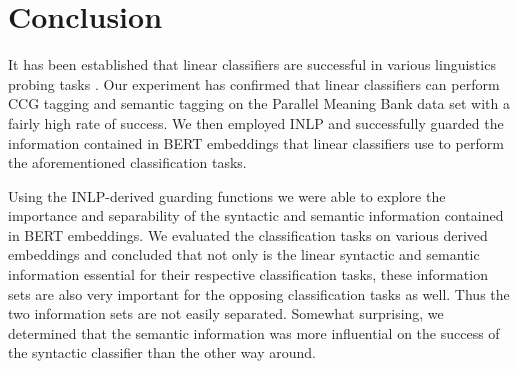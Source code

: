 \documentclass[11pt,a4paper]{article}
\begin{document}
        



\section{Conclusion}
\label{sec:conclusion}
It has been established that linear classifiers are successful in various linguistics probing tasks \citep{language-transfer}. Our experiment has confirmed that linear classifiers can perform CCG tagging and semantic tagging on the Parallel Meaning Bank data set \citep{pmbData} with a fairly high rate of success. We then employed INLP and successfully guarded the information contained in BERT embeddings that linear classifiers use to perform the aforementioned classification tasks. 

Using the INLP-derived guarding functions we were able to explore the importance and separability of the syntactic and semantic information contained in BERT embeddings. We evaluated the classification tasks on various derived embeddings and concluded that not only is the linear syntactic and semantic information essential for their respective classification tasks, these information sets are also very important for the opposing classification tasks as well. Thus the two information sets are not easily separated. Somewhat surprising, we determined that the semantic information was more influential on the success of the syntactic classifier than the other way around. 
\end{document}
